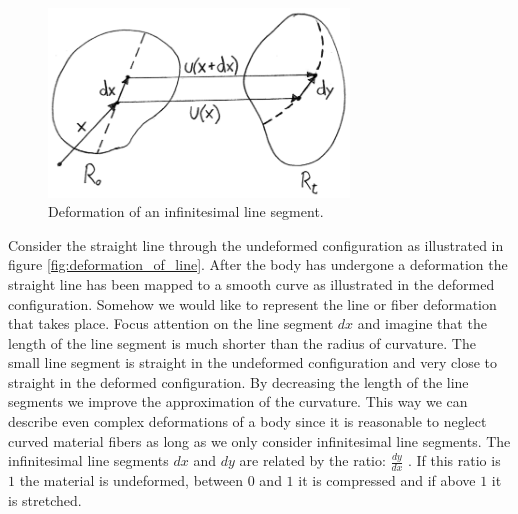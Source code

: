 
\begin{figure}
  \centering
  \includegraphics[width=8cm]{./images/physics_deformation_of_line.png}
\caption{Deformation of an infinitesimal line segment.}
\label{fig:deformation_of_line}
\end{figure}

Consider the straight line through the undeformed configuration as
illustrated in figure \vref{fig:deformation_of_line}. After the body
has undergone a deformation the straight line has been mapped to a
smooth curve as illustrated in the deformed configuration. Somehow we
would like to represent the line or fiber deformation that takes
place. Focus attention on the line segment $dx$ and imagine that the
length of the line segment is much shorter than the radius of
curvature. The small line segment is straight in the undeformed
configuration and very close to straight in the deformed
configuration. By decreasing the length of the line segments we
improve the approximation of the curvature. This way we can describe
even complex deformations of a body since it is reasonable to neglect
curved material fibers as long as we only consider infinitesimal line
segments. The infinitesimal line segments $dx$ and $dy$ are related by
the ratio: $\frac{dy}{dx}$
.
If this ratio is $1$ the material is undeformed, between $0$ and
$1$ it is compressed and if above $1$ it is stretched.
%

